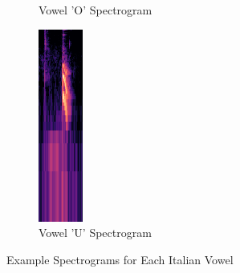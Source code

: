 \begin{figure}[htbp]
\begin{subfigure}[b]{0.19\textwidth}
        \caption{Vowel 'O' Spectrogram}
        \label{fig:vowel_o_spec}
    \end{subfigure}
    \hfill
    \begin{subfigure}[b]{0.19\textwidth}
        \includegraphics[width=\textwidth]{res/images/model/U.png}
        \caption{Vowel 'U' Spectrogram}
        \label{fig:vowel_u_spec}
    \end{subfigure}
    \caption{Example Spectrograms for Each Italian Vowel}
    \label{fig:vowel_spectrograms}
\end{figure}

